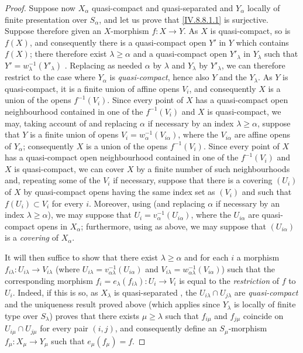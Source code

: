 \begin{proof}
Suppose now $X_\alpha$ quasi-compact and quasi-separated and $Y_\alpha$ locally of finite presentation over $S_\alpha$, and let us prove that \eqref{IV.8.8.1.1} is surjective.
Suppose therefore given an $X$-morphism $f:X\to Y$.
As $X$ is quasi-compact, so is
$f(X)$, and consequently there is a quasi-compact open $Y'$ in $Y$ which contains $f(X)$; there therefore exist $\lambda\geqslant\alpha$ and a quasi-compact open $Y'_\lambda$ in $Y_\lambda$ such that $Y'=w_\lambda^{-1}(Y'_\lambda)$ .
Replacing as needed $\alpha$ by $\lambda$ and $Y_\lambda$ by $Y'_\lambda$, we can therefore restrict to the case where $Y_\alpha$ is \emph{quasi-compact}, hence also $Y$ and the $Y_\lambda$.
As $Y$ is quasi-compact, it is a finite union of affine opens $V_i$, and consequently $X$ is a union of the opens $f^{-1}(V_i)$. Since every point of $X$ has a quasi-compact open neighbourhood contained in one of the $f^{-1}(V_i)$ and $X$ is quasi-compact, we may, taking account of  and replacing $\alpha$ if necessary by an index $\lambda\geqslant\alpha$, suppose that $Y$ is a finite union of opens $V_i=w_\alpha^{-1}(V_{i\alpha})$, where the $V_{i\alpha}$ are affine opens of $Y_\alpha$; consequently $X$ is a union of the opens $f^{-1}(V_i)$. Since every point of $X$ has a quasi-compact open neighbourhood contained in one of the $f^{-1}(V_i)$ and $X$ is quasi-compact, we can cover $X$ by a finite number of such neighbourhoods and, repeating some of the $V_i$ if necessary, suppose that there is a covering $(U_i)$ of $X$ by quasi-compact opens having the same index set as $(V_i)$ and such that $f(U_i)\subset V_i$ for every $i$. Moreover, using  (and replacing $\alpha$ if necessary by an index $\lambda\geqslant\alpha$), we may suppose that $U_i=v_\alpha^{-1}(U_{i\alpha})$, where the $U_{i\alpha}$ are quasi-compact opens in $X_\alpha$; furthermore, using  as above, we may suppose that $(U_{i\alpha})$ is a \emph{covering} of $X_\alpha$.

It will then suffice to show that there exist $\lambda\geqslant\alpha$ and for each $i$ a morphism $f_{i\lambda}:U_{i\lambda}\to V_{i\lambda}$ (where $U_{i\lambda}=v_{\alpha\lambda}^{-1}(U_{i\alpha})$ and $V_{i\lambda}=w_{\alpha\lambda}^{-1}(V_{i\alpha})$) such that the corresponding morphism $f_i=e_\lambda(f_{i\lambda}):U_i\to V_i$ is equal to the \emph{restriction} of $f$ to $U_i$.
Indeed, if this is so, as $X_\lambda$ is quasi-separated , the $U_{i\lambda}\cap U_{j\lambda}$ are \emph{quasi-compact} and the uniqueness result proved above (which applies since $Y_\lambda$ is locally of finite type over $S_\lambda$) proves that there exists $\mu\geqslant\lambda$ such that $f_{i\mu}$ and $f_{j\mu}$ coincide on $U_{i\mu}\cap U_{j\mu}$ for every pair $(i,j)$, and consequently define an $S_\mu$-morphism $f_\mu:X_\mu\to Y_\mu$ such that $e_\mu(f_\mu)=f$.


\end{proof}
